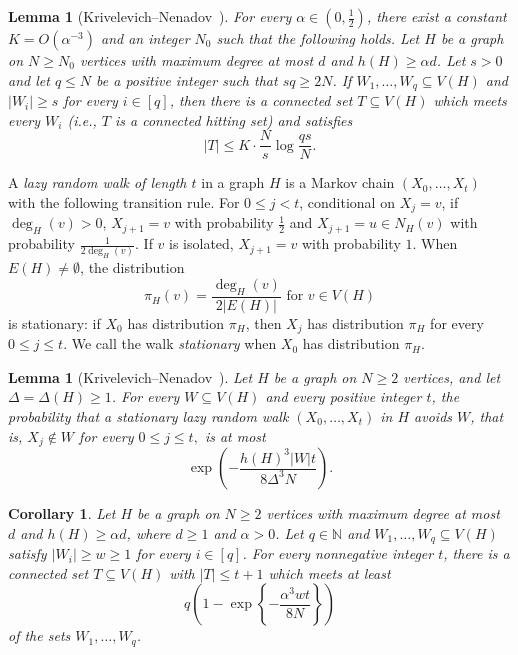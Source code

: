 \documentclass[11pt,a4paper]{article}
\newtheorem{corollary}[theorem]{Corollary}
\newtheorem{lemma}[theorem]{Lemma}
\theoremstyle{definition}
\theoremstyle{remark}
\newcommand{\N}{\mathbb N}
\begin{document}
\begin{lemma}
[Krivelevich--Nenadov~{\cite[Lemma~3.1]{KN}}]
\label{lem:connected-hitting}
For every $\alpha\in(0,\frac{1}{2})$, there exist a constant
$K=O(\alpha^{-3})$ and an integer $N_0$ such that the following
holds. Let $H$ be a graph on $N\ge N_0$ vertices with maximum degree
at most $d$ and $h(H)\ge\alpha d$. Let $s>0$ and let $q\le N$ be a
positive integer such that $sq\ge2N$. If
$W_1,\ldots,W_q\subseteq V(H)$ and $|W_i|\ge s$ for every
$i\in[q]$, then there is a connected set $T\subseteq V(H)$ which
meets every $W_i$ (i.e., $T$ is a connected hitting set) and satisfies
\[
 |T|\le K\cdot \frac{N}{s}\log\frac{qs}{N}.
\]
\end{lemma}

A \emph{lazy random walk of length $t$} in a graph $H$ is a Markov
chain $(X_0,\ldots,X_t)$ with the following transition rule. 
For
$0\le j<t$, conditional on $X_j=v$, if $\deg_H(v)>0$, $X_{j+1}=v$ with probability $\frac{1}{2}$ and $X_{j+1}=u\in N_H(v)$ with probability
$\frac{1}{2\deg_H(v)}$. If $v$ is isolated, $X_{j+1}=v$ with
probability $1$. 
When $E(H)\ne\emptyset$, the distribution
\[
  \pi_H(v)=\frac{\deg_H(v)}{2|E(H)|} \text{ for } v\in V(H)
\]
is stationary: if $X_0$ has distribution $\pi_H$, then $X_j$ has
distribution $\pi_H$ for every $0\le j\le t$. We call the walk
\emph{stationary} when $X_0$ has distribution $\pi_H$. 

\begin{lemma}
[Krivelevich--Nenadov~{\cite[Lemma~2.4]{KN}}]
\label{lem:avoid}
Let \(H\) be a graph on \(N\ge 2\) vertices, and let
\(\Delta=\Delta(H)\ge 1\).
For every \(W\subseteq V(H)\) and every positive integer \(t\),
the probability that a stationary lazy random walk
\((X_0,\ldots,X_t)\) in \(H\) avoids \(W\), that is,
$X_j\notin W$ for every $0\le j\le t,$
is at most
\[
    \exp\left(
        -\frac{h(H)^3|W|t}{8\Delta^3N}
    \right).
\]
\end{lemma}

\begin{corollary}\label{cor:partial-hitting}
Let $H$ be a graph on $N\ge2$ vertices with maximum degree at most
$d$ and $h(H)\ge\alpha d$, where $d\ge1$ and $\alpha>0$. Let
$q\in\N$ and
$W_1,\ldots,W_q\subseteq V(H)$ satisfy $|W_i|\ge w\ge1$ for every
$i\in[q]$. For every nonnegative integer $t$, there is a connected
set $T\subseteq V(H)$ with $|T|\le t+1$ which meets at least
\[
 q\left(1-\exp\left\{-\frac{\alpha^3wt}{8N}\right\}\right)
\]
of the sets $W_1,\ldots,W_q$.
\end{corollary}
\end{document}

